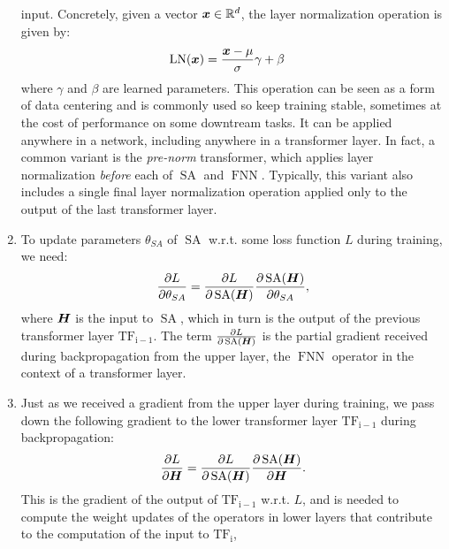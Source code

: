 \documentclass[11pt,a4paper]{article}
\newcommand\op[1]{\operatorname{#1}}
\begin{document}
\begin{enumerate}[label=(\alph*)]
          input.
          Concretely, given a vector ${\boldsymbol{x}}\in\mathbb{R}^d$, the layer normalization
          operation is given by:
          \begin{align}
              \op{LN}(\vx) & = \frac{\vx - \mu}{\sigma} \gamma + \beta
          \end{align}
          where $\gamma$ and $\beta$ are learned parameters.
          This operation can be seen as a form of data centering and is commonly
          used so keep training stable, sometimes at the cost of performance on
          some downtream tasks.
          It can be applied anywhere in a network, including anywhere in a
          transformer layer.
          In fact, a common variant is the \emph{pre-norm} transformer, which
          applies layer normalization \emph{before} each of $\op{SA}$ and
          $\op{FNN}$.
          Typically, this variant also includes a single final layer
          normalization operation applied only to the output of the last
          transformer layer.
    \item To update parameters $\theta_{SA}$ of $\op{SA}$ w.r.t. some loss
          function $L$ during training, we need:
          \begin{align}\label{eq:weight_gradient}
              \frac{\partial L}{\partial \theta_{SA}} = \frac{\partial L}{\partial \op{SA}(\mH)}\frac{\partial \op{SA}(\mH)}{\partial \theta_{SA}},
          \end{align}
          where ${\boldsymbol{H}}$ is the input to $\op{SA}$, which in turn is the output of
          the previous transformer layer $\op{TF_{i-1}}$.
          The term $\frac{\partial L}{\partial \op{SA}(\mH)}$ is the partial
          gradient received during backpropagation from the upper layer, the
          $\op{FNN}$ operator in the context of a transformer layer.
    \item Just as we received a gradient from the upper layer during training,
          we pass down the following gradient to the lower transformer layer
          $\op{TF_{i-1}}$ during backpropagation:
          \begin{align}\label{eq:input_gradient}
              \frac{\partial L}{\partial \mH} = \frac{\partial L}{\partial \op{SA}(\mH)}\frac{\partial \op{SA}(\mH)}{\partial \mH}.
          \end{align}
          This is the gradient of the output of $\op{TF_{i-1}}$ w.r.t. $L$, and
          is needed to compute the weight updates of the operators in lower
          layers that contribute to the computation of the input to $\op{TF_i}$,

\end{enumerate}
\end{document}

